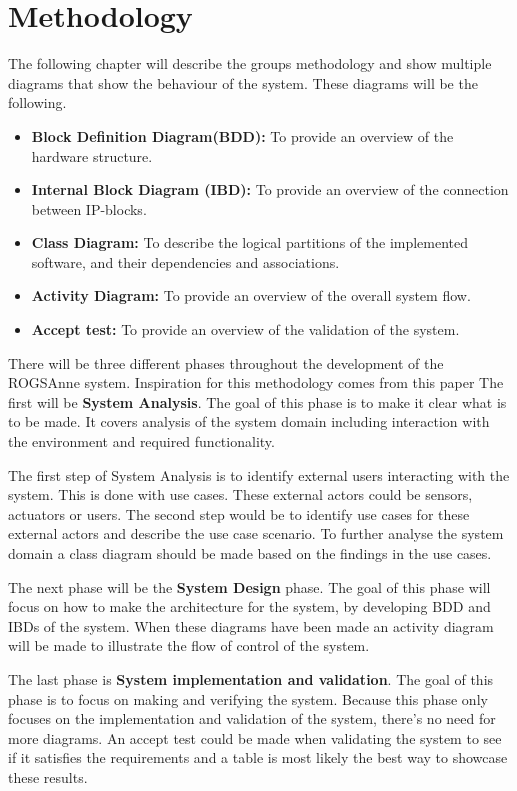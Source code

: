 
\chapter{Methodology}
The following chapter will describe the groups methodology and show multiple diagrams that show the behaviour of the system. These diagrams will be the following.

\begin{itemize}
	\item\textbf{Block Definition Diagram(BDD):} To provide an overview of the hardware structure.
	
	\item \textbf{Internal Block Diagram (IBD):} To provide an overview of the connection between IP-blocks.
	
	\item \textbf{Class Diagram:} To describe the logical partitions of the implemented software, and their dependencies and associations.
	
	\item \textbf{Activity Diagram:} To provide an overview of the overall system flow.
	
	\item \textbf{Accept test:} To provide an overview of the validation of the system.
\end{itemize}

There will be three different phases throughout the development of the ROGSAnne system. Inspiration for this methodology comes from this paper \cite{A_HW_SW_CodesignMethodology} The first will be \textbf{System Analysis}. The goal of this phase is to make it clear what is to be made. It covers analysis of the system domain including interaction with the environment and required functionality.

The first step of System Analysis is to identify external users interacting with the system. This is done with use cases. These external actors could be sensors, actuators or users. The second step would be to identify use cases for these external actors and describe the use case scenario. 
To further analyse the system domain a class diagram should be made based on the findings in the use cases.

The next phase will be the \textbf{System Design} phase. The goal of this phase will focus on how to make the architecture for the system, by developing BDD and IBDs of the system. When these diagrams have been made an activity diagram will be made to illustrate the flow of control of the system.

The last phase is \textbf{System implementation and validation}. The goal of this phase is to focus on making and verifying the system. Because this phase only focuses on the implementation and validation of the system, there's no need for more diagrams. An accept test could be made when validating the system to see if it satisfies the requirements and a table is  most likely the best way to showcase these results.


